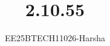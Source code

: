 \documentclass[journal]{IEEEtran}
\begin{document}

\vspace{3cm}

\title{2.10.55}
\author{EE25BTECH11026-Harsha}
 \maketitle
{\let\newpage\relax\maketitle}

\renewcommand{\thefigure}{\theenumi}
\renewcommand{\thetable}{\theenumi}
\setlength{\intextsep}{10pt} %


\renewcommand{\thetable}{\theenumi}
\end{document}
